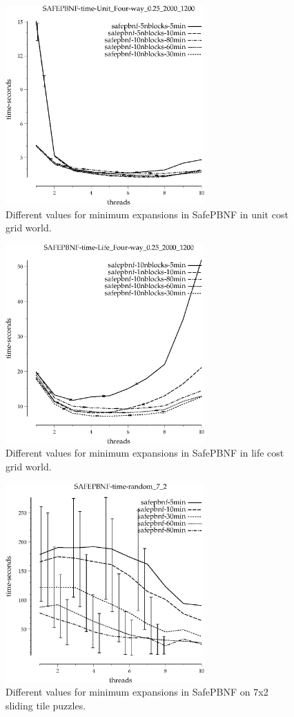\documentclass{article}
\begin{document}
\begin{figure}[h!]
\includegraphics[width=3in]{../graphs/grid_unit_four-way_0.25_2000_1200/SAFEPBNF-time-Unit_Four-way_0.25_2000_1200.eps}
\caption{Different values for minimum expansions in SafePBNF in unit cost grid world.}
\label{fig:SafePBNF-min-grid}
\end{figure}

\begin{figure}[h!]
\includegraphics[width=3in]{../graphs/grid_life_four-way_0.25_2000_1200/SAFEPBNF-time-Life_Four-way_0.25_2000_1200.eps}
\caption{Different values for minimum expansions in SafePBNF in life cost grid world.}
\label{fig:SafePBNF-min-life}
\end{figure}

\begin{figure}[h!]
\includegraphics[width=3in]{../graphs/tiles_random_7_2/SAFEPBNF-time-random_7_2.eps}
\caption{Different values for minimum expansions in SafePBNF on 7x2 sliding tile puzzles.}
\label{fig:SafePBNF-min-tile}
\end{figure}
\end{document}
